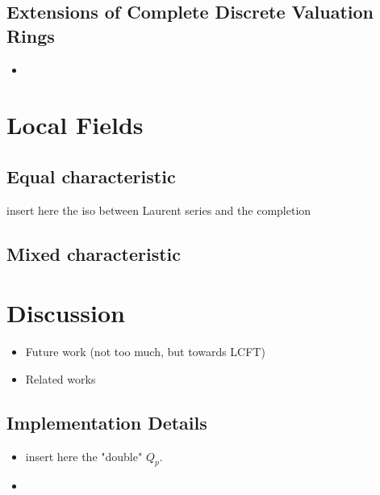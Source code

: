 \documentclass[sigplan,10pt,anonymous,review]{acmart}\settopmatter{printfolios=true,printccs=false,printacmref=false}
\begin{document}
\subsection{Extensions of Complete Discrete Valuation Rings}
\begin{itemize}
\item 
\end{itemize}
\section{Local Fields}
\subsection{Equal characteristic}
insert here the iso between Laurent series and the completion
\subsection{Mixed characteristic}
\section{Discussion}
\begin{itemize}
\item Future work (not too much, but towards LCFT)
\item Related works
\end{itemize}
\subsection{Implementation Details}
\begin{itemize}
\item insert here the "double" $Q_p$.
\item 
\end{itemize}
\end{document}
